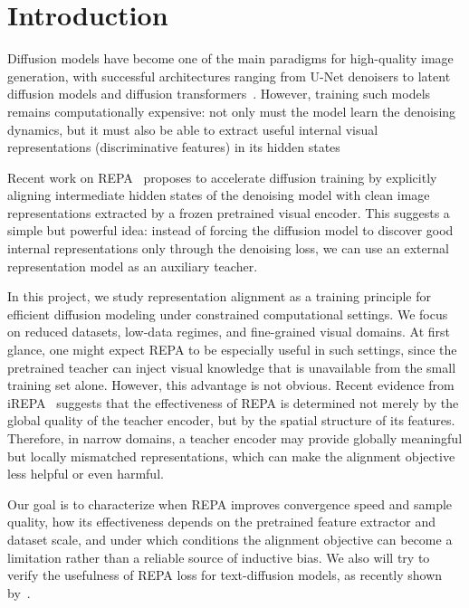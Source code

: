 \section{Introduction}
Diffusion models have become one of the main paradigms for high-quality image generation, with successful architectures ranging from U-Net denoisers to latent diffusion models and diffusion transformers~\cite{ronneberger2015unet,ho2020ddpm,rombach2022ldm,peebles2023dit}. However, training such models remains computationally expensive: not only must the model learn the denoising dynamics, but it must also be able to extract useful internal visual representations (discriminative features) in its hidden states~\cite{li2023dreamteacher,xiang2023ddae,chen2024deconstructing,mukhopadhyay2023diffusion}

Recent work on REPA~\cite{yu2025repa} proposes to accelerate diffusion training by explicitly aligning intermediate hidden states of the denoising model with clean image representations extracted by a frozen pretrained visual encoder. This suggests a simple but powerful idea: instead of forcing the diffusion model to discover good internal representations only through the denoising loss, we can use an external representation model as an auxiliary teacher.

In this project, we study representation alignment as a training principle for efficient diffusion modeling under constrained computational settings. We focus on reduced datasets, low-data regimes, and fine-grained visual domains. At first glance, one might expect REPA to be especially useful in such settings, since the pretrained teacher can inject visual knowledge that is unavailable from the small training set alone. However, this advantage is not obvious. Recent evidence from iREPA~\cite{singh2026irepa} suggests that the effectiveness of REPA is determined not merely by the global quality of the teacher encoder, but by the spatial structure of its features. Therefore, in narrow domains, a teacher encoder may provide globally meaningful but locally mismatched representations, which can make the alignment objective less helpful or even harmful.

Our goal is to characterize when REPA improves convergence speed and sample quality, how its effectiveness depends on the pretrained feature extractor and dataset scale, and under which conditions the alignment objective can become a limitation rather than a reliable source of inductive bias. We also will try to verify the usefulness of REPA loss for text-diffusion models, as recently shown by~\cite{junior2026accelerating}.
